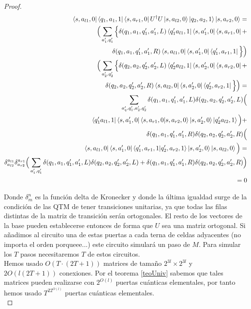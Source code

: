 \begin{proof}
\begin{equation}
\begin{split}
\bra{s,a_{l1},0}\bra{q_1,a_1,1}\bra{s,a_{r1},0}U^\dag U\ket{s,a_{l2},0}\ket{q_2,a_2,1}\ket{s,a_{r2},0}=\\
\Big(\sum_{a_1',q_1'}\Big\{\delta(q_1,a_1,q_1',a_1',L)\bra{q_1'a_{l1},1}\bra{s,a_1',0}\bra{s,a_{r1},0}+\\
\delta(q_1,a_1,q_1',a_1',R)\bra{s,a_{l1},0}\bra{s,a_1',0}\bra{q_1',a_{r1},1}\Big\}\Big)\\
\Big(\sum_{a_2',q_2'}\Big\{\delta(q_2,a_2,q_2',a_2',L)\bra{q_2'a_{l2},1}\bra{s,a_2',0}\bra{s,a_{r2},0}+\\
\delta(q_2,a_2,q_2',a_2',R)\bra{s,a_{l2},0}\bra{s,a_2',0}\bra{q_2',a_{r2},1}\Big\}\Big)=\\
\sum_{a_q',q_1',a_2',q_2'}\delta(q_1,a_1,q_1',a_1',L)\delta(q_2,a_2,q_2',a_2',L)\Big(\\
\bra{q_1'a_{l1},1}\bra{s,a_1',0}\bra{s,a_{r1},0}\ket{s,a_{r2},0}\ket{s,a_2',0}\ket{q_2'a_{l2},1}\Big)+\\
\delta(q_1,a_1,q_1',a_1',R)\delta(q_2,a_2,q_2',a_2',R)\Big(\\
\bra{s,a_{l1},0}\bra{s,a_1',0}\bra{q_1',a_{r1},1}\ket{q_2',a_{r2},1}\ket{s,a_2',0}\ket{s,a_{l2},0}\Big)=\\
\delta^{a_{l1}}_{a_{l2}}\delta^{a_{r1}}_{a_{r2}}\Big(\sum_{a_1',q_1'}\delta(q_1,a_1,q_1',a_1',L)\delta(q_2,a_2,q_2',a_2',L)+\delta(q_1,a_1,q_1',a_1',R)\delta(q_2,a_2,q_2',a_2',R)\Big)\\
=0
\end{split}
\end{equation}


Donde $\delta_m^n$ es la función delta de Kronecker y donde la última igualdad surge de la condición de las QTM de tener transiciones unitarias, ya que todas las filas distintas de la matriz de transición serán ortogonales. El resto de los vectores de la base pueden establecerse entonces de forma que $U$ sea una matriz ortogonal. Si añadimos al circuito una de estas puertas a cada terna de celdas adyacentes (no importa el orden porqueee...) este circuito simulará un paso de $M$. Para simular los $T$ pasos necesitaremos $T$ de estos circuitos.\\

Hemos usado $O(T\cdot (2T+1))$ matrices de tamaño $2^{3l}\times 2^{3l}$ y $2O(l(2T+1))$ conexiones. Por el teorema \ref{teoUniv} sabemos que tales matrices pueden realizarse con $2^{O(l)}$ puertas cuánticas elementales, por tanto hemos usado $T^22^{O(l)}$ puertas cuánticas elementales.\\

\end{proof}

